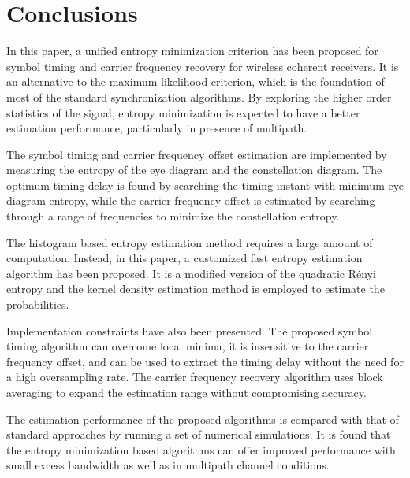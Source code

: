 \documentclass[12pt, draftclsnofoot, onecolumn]{IEEEtran}
\begin{document}


\section{Conclusions}
\label{sec:conc}
In this paper, a unified entropy minimization criterion has been proposed for symbol timing and carrier frequency recovery for wireless coherent receivers.
It is an alternative to the maximum likelihood criterion, which is the foundation of most of the standard synchronization algorithms. 
By exploring the higher order statistics of the signal, entropy minimization is expected to have a better estimation performance, particularly in presence of multipath.  

The symbol timing and carrier frequency offset estimation are implemented by measuring the entropy of the eye diagram and the constellation diagram.
% 
% 
The optimum timing delay is found by searching the timing instant with minimum eye diagram entropy, while the carrier frequency offset is estimated by searching through a range of frequencies to minimize the constellation entropy.  

The histogram based entropy estimation method requires a large amount of computation.
Instead, in this paper, a customized fast entropy estimation algorithm has been proposed.
It is a modified version of the quadratic R\'enyi entropy and the kernel density estimation method is employed to estimate the probabilities.

Implementation constraints have also been presented. 
The proposed symbol timing algorithm can overcome local minima, it is insensitive to the carrier frequency offset, and can be used to extract the timing delay without the need for a high oversampling rate.
The carrier frequency recovery algorithm uses block averaging to expand the estimation range without compromising accuracy. 

The estimation performance of the proposed algorithms is compared with that of standard approaches by running a set of numerical simulations.
It is found that the entropy minimization based algorithms can offer improved performance with small excess bandwidth as well as  in multipath channel conditions.
% 
% 
\small


\end{document}
